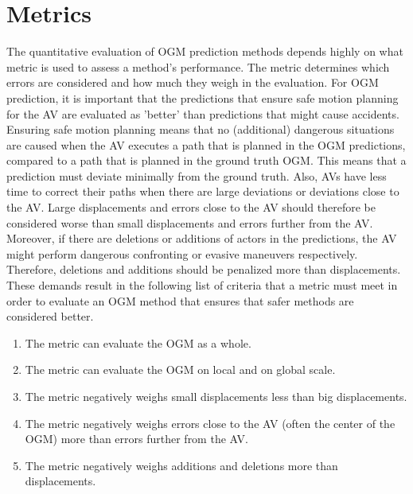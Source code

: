 


\newpage

\section{Metrics} \label{sec:metrics}

The quantitative evaluation of \gls{OGM} prediction methods depends highly on what metric is used to assess a method's performance. The metric determines which errors are considered and how much they weigh in the evaluation. For \gls{OGM} prediction, it is important that the predictions that ensure safe motion planning for the \gls{AV} are evaluated as 'better' than predictions that might cause accidents. Ensuring safe motion planning means that no (additional) dangerous situations are caused when the \gls{AV} executes a path that is planned in the \gls{OGM} predictions, compared to a path that is planned in the ground truth \gls{OGM}. This means that a prediction must deviate minimally from the ground truth. Also, \glspl{AV} have less time to correct their paths when there are large deviations or deviations close to the \gls{AV}. Large displacements and errors close to the \gls{AV} should therefore be considered worse than small displacements and errors further from the \gls{AV}. Moreover, if there are deletions or additions of actors in the predictions, the \gls{AV} might perform dangerous confronting or evasive maneuvers respectively. Therefore, deletions and additions should be penalized more than displacements. These demands result in the following list of criteria that a metric must meet in order to evaluate an \gls{OGM} method that ensures that safer methods are considered better.  

\begin{enumerate}
	\item The metric can evaluate the \gls{OGM} as a whole.
	\item The metric can evaluate the \gls{OGM} on local and on global scale.
	\item The metric negatively weighs small displacements less than big displacements. 
	\item The metric negatively weighs errors close to the \gls{AV} (often the center of the \gls{OGM}) more than errors further from the \gls{AV}.
	\item The metric negatively weighs additions and deletions more than displacements.
\end{enumerate}


